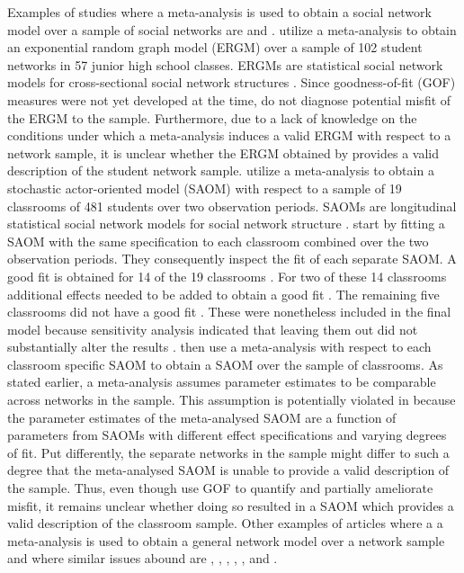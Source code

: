 \documentclass[a4paper, man]{apa6}
\begin{document}
Examples of studies where a meta-analysis is used to obtain a social network model over a sample of social networks are  and .  utilize a meta-analysis to obtain an exponential random graph model (ERGM) over a sample of 102 student networks in 57 junior high school classes. ERGMs are statistical social network models for cross-sectional social network structures \cite{lusher2013exponential}. Since goodness-of-fit (GOF) measures were not yet developed at the time,  do not diagnose potential misfit of the ERGM to the sample. Furthermore, due to a lack of knowledge on the conditions under which a meta-analysis induces a valid ERGM with respect to a network sample, it is unclear whether the ERGM obtained by  provides a valid description of the student network sample.  utilize a meta-analysis to obtain a stochastic actor-oriented model (SAOM) with respect to a sample of 19 classrooms of 481 students over two observation periods. SAOMs are longitudinal statistical social network models for social network structure \cite{snijders2001statistical}.  start by fitting a SAOM with the same specification to each classroom combined over the two observation periods. They consequently inspect the fit of each separate SAOM. A good fit is obtained for 14 of the 19 classrooms \cite{rambaran2020bullying}. For two of these 14 classrooms additional effects needed to be added to obtain a good fit \cite{rambaran2020bullying}. \clearpage \noindent The remaining five classrooms did not have a good fit \cite{rambaran2020bullying}. These were nonetheless included in the final model because sensitivity analysis indicated that leaving them out did not substantially alter the results \cite{rambaran2020bullying}.  then use a meta-analysis with respect to each classroom specific SAOM to obtain a SAOM over the sample of classrooms. As stated earlier, a meta-analysis assumes parameter estimates to be comparable across networks in the sample. This assumption is potentially violated in  because the parameter estimates of the meta-analysed SAOM are a function of parameters from SAOMs with different effect specifications and varying degrees of fit. Put differently, the separate networks in the sample might differ to such a degree that the meta-analysed SAOM is unable to provide a valid description of the sample. Thus, even though  use GOF to quantify and partially ameliorate misfit, it remains unclear whether doing so resulted in a SAOM which provides a valid description of the classroom sample. Other examples of articles where a a meta-analysis is used to obtain a general network model over a network sample and where similar issues abound are , , , , , and .   
\end{document}
